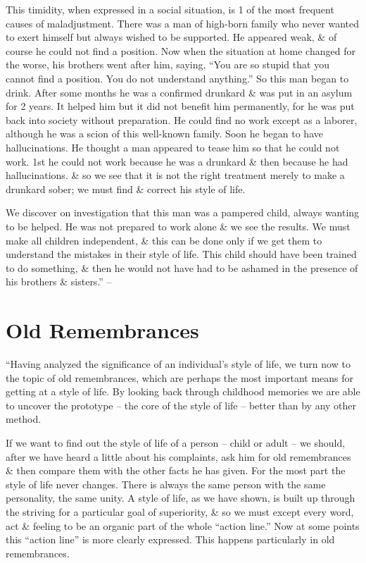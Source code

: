 \documentclass{article}
\begin{document}
This timidity, when expressed in a social situation, is 1 of the most frequent causes of maladjustment. There was a man of high-born family who never wanted to exert himself but always wished to be supported. He appeared weak, \& of course he could not find a position. Now when the situation at home changed for the worse, his brothers went after him, saying, ``You are so stupid that you cannot find a position. You do not understand anything.'' So this man began to drink. After some months he was a confirmed drunkard \& was put in an asylum for 2 years. It helped him but it did not benefit him permanently, for he was put back into society without preparation. He could find no work except as a laborer, although he was a scion of this well-known family. Soon he began to have hallucinations. He thought a man appeared to tease him so that he could not work. 1st he could not work because he was a drunkard \& then because he had hallucinations. \& so we see that it is not the right treatment merely to make a drunkard sober; we must find \& correct his style of life.

We discover on investigation that this man was a pampered child, always wanting to be helped. He was not prepared to work alone \& we see the results. We must make all children independent, \& this can be done only if we get them to understand the mistakes in their style of life. This child should have been trained to do something, \& then he would not have had to be ashamed in the presence of his brothers \& sisters.'' -- \cite[pp. 98--116]{Adler_science_living}


\section{Old Remembrances}
``Having analyzed the significance of an individual's style of life, we turn now to the topic of old remembrances, which are perhaps the most important means for getting at a style of life. By looking back through childhood memories we are able to uncover the prototype -- the core of the style of life -- better than by any other method.

If we want to find out the style of life of a person -- child or adult -- we should, after we have heard a little about his complaints, ask him for old remembrances \& then compare them with the other facts he has given. For the most part the style of life never changes. There is always the same person with the same personality, the same unity. A style of life, as we have shown, is built up through the striving for a particular goal of superiority, \& so we must except every word, act \& feeling to be an organic part of the whole ``action line.'' Now at some points this ``action line'' is more clearly expressed. This happens particularly in old remembrances.
\end{document}
